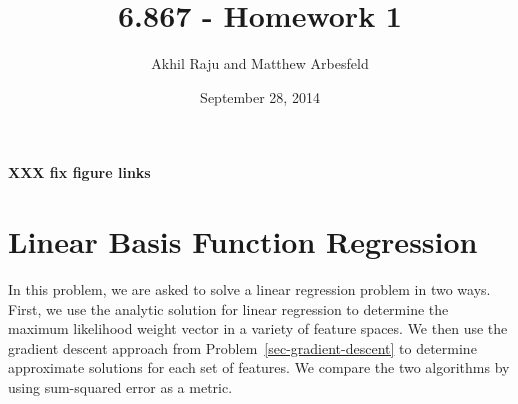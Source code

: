 \documentclass[11pt]{article}   %
\theoremstyle{plain}
\begin{document}
\pagestyle{myheadings}          %
\title{6.867 - Homework 1}           %
\author{Akhil Raju and Matthew Arbesfeld}
\date{September 28, 2014}         %
\maketitle
\textbf{XXX fix figure links}

\section{Linear Basis Function Regression}\label{sec-basis}
In this problem, we are asked to solve a linear regression problem in two ways. First, we use the analytic solution for linear regression to determine the maximum likelihood weight vector in a variety of feature spaces. We then use the gradient descent approach from Problem~\ref{sec-gradient-descent} to determine approximate solutions for each set of features. We compare the two algorithms by using sum-squared error as a metric.
\end{document}
